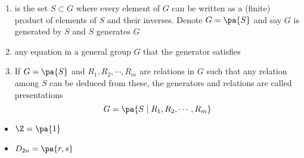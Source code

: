 \documentclass[11pt]{article}
\begin{document}
\begin{definition*}
    \begin{enumerate}
        \item {} is the set $S\subset G$ where every element of $G$ can be written as a (finite) product of elements of $S$ and their inverses. Denote $G = \pa{S}$ and say $G$ is generated by $S$ and $S$ generates $G$ 
        \item {} any equation in a general group $G$ that the generator satisfies
        \item {} If $G=\pa{S}$ and $R_1,R_2,\cdots,R_m$ are relations in $G$ such that any relation among $S$ can be deduced from these, the generators and relations are called presentations
        \[
            G = \pa{S \mid R_1, R_2, \cdots, R_m}    
        \]
    \end{enumerate}
    \begin{itemize}
        \item {} $\Z = \pa{1}$
        \item {} $D_{2n} = \pa{r,s}$
    \end{itemize}
\end{definition*}


\section{}
\end{document}

